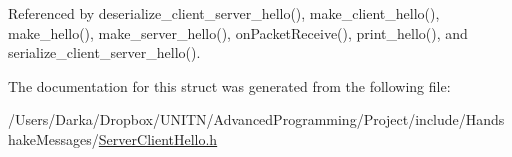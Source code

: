 Referenced by deserialize\+\_\+client\+\_\+server\+\_\+hello(), make\+\_\+client\+\_\+hello(), make\+\_\+hello(), make\+\_\+server\+\_\+hello(), on\+Packet\+Receive(), print\+\_\+hello(), and serialize\+\_\+client\+\_\+server\+\_\+hello().



The documentation for this struct was generated from the following file\+:\begin{DoxyCompactItemize}
\item 
/\+Users/\+Darka/\+Dropbox/\+U\+N\+I\+T\+N/\+Advanced\+Programming/\+Project/include/\+Handshake\+Messages/\hyperlink{_server_client_hello_8h}{Server\+Client\+Hello.\+h}\end{DoxyCompactItemize}
